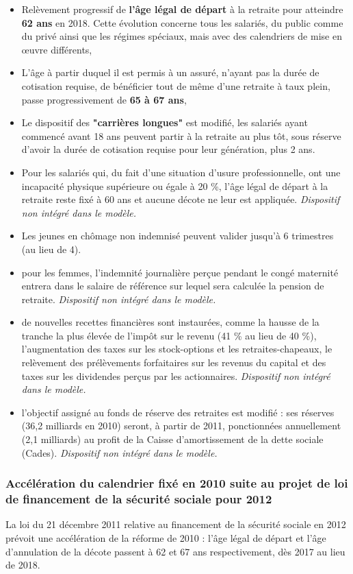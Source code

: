 \begin{itemize}
	\item  Relèvement progressif de \textbf{l'âge légal de départ} à 
la retraite pour atteindre \textbf{62 ans} en 2018. Cette évolution 
concerne tous les salariés, du public comme du privé ainsi 
que les régimes spéciaux, mais avec des calendriers de mise 
en œuvre différents,
	\item   L'âge à partir duquel il est permis à un assuré, 
n'ayant pas la durée de cotisation requise, de bénéficier 
tout de même d'une retraite à taux plein, passe 
progressivement de \textbf{65 à 67 ans},
	\item   Le dispositif des \textbf{"carrières longues"} est modifié, 
les salariés ayant commencé avant 18 ans peuvent partir à la 
retraite au plus tôt, sous réserve d'avoir la durée de 
cotisation requise pour leur génération, plus 2 ans.
	\item   Pour les salariés qui, du fait d'une situation 
d'usure professionnelle, ont une incapacité physique 
supérieure ou égale à 20 \%, l'âge légal de départ à la 
retraite reste fixé à 60 ans et aucune décote ne leur est 
appliquée. \textit{Dispositif non intégré dans le modèle.}
	\item   Les jeunes en chômage non indemnisé peuvent 
valider jusqu'à 6 trimestres (au lieu de 4).
	 \item    pour les femmes, l'indemnité journalière perçue 
 pendant le congé maternité entrera dans le salaire de 
 référence sur lequel sera calculée la pension de retraite. \textit{Dispositif non intégré dans le modèle.}
	 \item    de nouvelles recettes financières sont instaurées, 
 comme la hausse de la tranche la plus élevée de l'impôt sur 
 le revenu (41 \% au lieu de 40 \%), l'augmentation des 
 taxes sur les stock-options et les retraites-chapeaux, le 
 relèvement des prélèvements forfaitaires sur les revenus du 
 capital et des taxes sur les dividendes perçus par les 
 actionnaires. \textit{Dispositif non intégré dans le modèle.}
	 \item    l'objectif assigné au fonds de réserve des 
 retraites est modifié : ses réserves (36,2 milliards en 2010)
  seront, à partir de 2011, ponctionnées annuellement (2,1 
 milliards) au profit de la Caisse d'amortissement de la 
 dette sociale (Cades). \textit{Dispositif non intégré dans le modèle.}
\end{itemize}

\subsubsection{Accélération du calendrier fixé en 2010 suite au projet de loi de financement de la sécurité sociale pour 2012}
La loi du 21 décembre 2011 relative au financement de la sécurité sociale en 2012 prévoit une accélération de la réforme de 2010 : l'âge légal de départ et l'âge d'annulation de la décote passent à 62 et 67 ans respectivement, dès 2017 au lieu de 2018.

